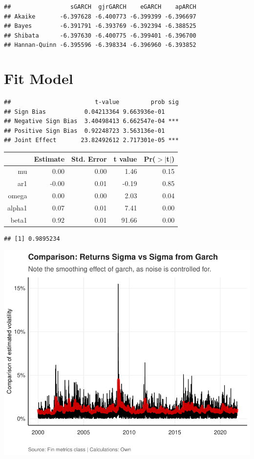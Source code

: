 \documentclass[11pt,preprint, authoryear]{elsarticle}
\let\origtable\table
\let\endorigtable\endtable
\renewenvironment{table}[1][2] {
    \expandafter\origtable\expandafter[H]
} {
    \endorigtable
}
\numberwithin{equation}{section}
\numberwithin{figure}{section}
\numberwithin{table}{section}
\begin{document}
\begin{verbatim}
##                 sGARCH  gjrGARCH    eGARCH    apARCH
## Akaike       -6.397628 -6.400773 -6.399399 -6.396697
## Bayes        -6.391791 -6.393769 -6.392394 -6.388525
## Shibata      -6.397630 -6.400775 -6.399401 -6.396700
## Hannan-Quinn -6.395596 -6.398334 -6.396960 -6.393852
\end{verbatim}

\hypertarget{fit-model}{%
\section{Fit Model}\label{fit-model}}

\begin{verbatim}
##                        t-value         prob sig
## Sign Bias           0.04213364 9.663936e-01    
## Negative Sign Bias  3.40498413 6.662547e-04 ***
## Positive Sign Bias  0.92248723 3.563136e-01    
## Joint Effect       23.82492612 2.717301e-05 ***
\end{verbatim}

\begin{table}[ht]
\centering
\begin{tabular}{rrrrr}
  \hline
 &  Estimate &  Std. Error &  t value & Pr($>$$|$t$|$) \\ 
  \hline
mu & 0.00 & 0.00 & 1.46 & 0.15 \\ 
  ar1 & -0.00 & 0.01 & -0.19 & 0.85 \\ 
  omega & 0.00 & 0.00 & 2.03 & 0.04 \\ 
  alpha1 & 0.07 & 0.01 & 7.41 & 0.00 \\ 
  beta1 & 0.92 & 0.01 & 91.66 & 0.00 \\ 
   \hline
\end{tabular}
\end{table}

\begin{verbatim}
## [1] 0.9895234
\end{verbatim}

\includegraphics{Question5_files/figure-latex/unnamed-chunk-14-1.pdf}
\end{document}
